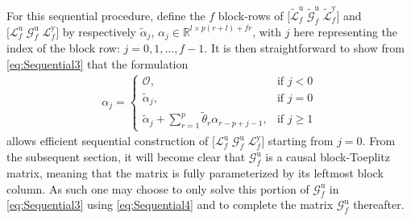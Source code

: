 For this sequential procedure, define the $f$ block-rows of $\big[\widetilde{\mathcal{L}}^\mathrm{u}_f \; \widetilde{\mathcal{G}}^\mathrm{u}_f \; \widetilde{\mathcal{L}}^\mathrm{y}_f\big]$ and $\big[\mathcal{L}^\mathrm{u}_f \; \mathcal{G}^\mathrm{u}_f \; \mathcal{L}^\mathrm{y}_f\big]$ by respectively $\tilde{\alpha}_j$, ${\alpha_j\in\mathbb{R}^{l\times p(r+l)+fr}}$, with $j$ here representing the index of the block row: $j=0,1,\dots,f-1$. It is then straightforward to show from \eqref{eq:Sequential3} that the formulation
\begin{align}\label{eq:Sequential4}
    \alpha_j=
    \left\{\begin{array}{ll}
    \mathcal{O},     & \text{if } j<0\\
    \tilde{\alpha}_j,& \text{if } j=0\\
    \tilde{\alpha}_j + \sum\limits_{r=1}^{p}\tilde{\theta}_r\alpha_{r-p+j-1}, & \text{if } j \geq 1
    \end{array}\right.
\end{align}
 allows efficient sequential construction of $\big[\mathcal{L}^\mathrm{u}_f \; \mathcal{G}^\mathrm{u}_f \; \mathcal{L}^\mathrm{y}_f\big]$ starting from $j=0$. From the subsequent section, it will become clear that $\mathcal{G}^\mathrm{u}_f$ is a causal block-Toeplitz matrix, meaning that the matrix is fully parameterized by its leftmost block column. As such one may choose to only solve this portion of $\mathcal{G}^\mathrm{u}_f$ in \eqref{eq:Sequential3} using \eqref{eq:Sequential4} and to complete the matrix $\mathcal{G}^\mathrm{u}_f$ thereafter.
